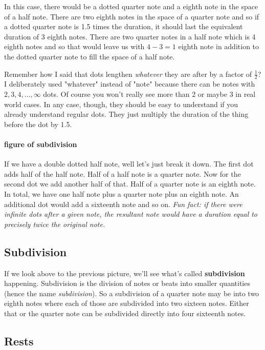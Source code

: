 \documentclass[../OpenAppliedMusicTheory.tex]{subfiles}
\begin{document}
        In this case, there would be a dotted quarter note and a eighth note in the space of a half note. There are two eighth notes in the space of a quarter note and so if a dotted quarter note is 1.5 times the duration, it should last the equivalent duration of 3 eighth notes. There are two quarter notes in a half note which is 4 eighth notes and so that would leave us with $4-3=1$ eighth note in addition to the dotted quarter note to fill the space of a half note.

        Remember how I said that dots lengthen \emph{whatever} they are after by a factor of $\frac{1}{2}$? I deliberately used "whatever" instead of "note" because there can be notes with $2, 3, 4, \dots, \infty$ dots. Of course you won't really see more than 2 or maybe 3 in real world cases. In any case, though, they should be easy to understand if you already understand regular dots. They just multiply the duration of the thing before the dot by 1.5. 

        \paragraph{figure of subdivision}

        If we have a double dotted half note, well let's just break it down. The first dot adds half of the half note. Half of a half note is a quarter note. Now for the second dot we add another half of that. Half of a quarter note is an eighth note. In total, we have one half note plus a quarter note plus an eighth note. An additional dot would add a sixteenth note and so on. \emph{Fun fact: if there were infinite dots after a given note, the resultant note would have a duration equal to precisely twice the original note.}

        \subsection{Subdivision}
        If we look above to the previous picture, we'll see what's called \textbf{subdivision} happening. Subdivision is the division of notes or beats into smaller quantities (hence the name \emph{subdivision}). So a subdivision of a quarter note may be into two eighth notes where each of those are subdivided into two sixteen notes. Either that or the quarter note can be subdivided directly into four sixteenth notes.

        \subsection{Rests}
\end{document}
